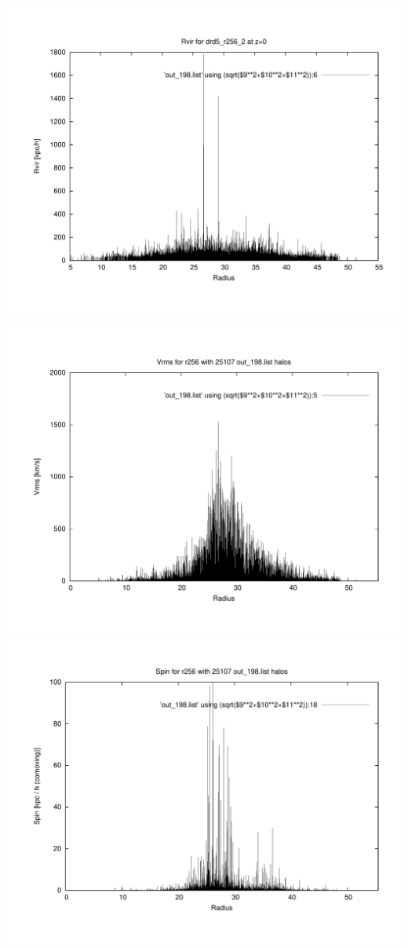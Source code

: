 \includegraphics[scale=0.3]{r256/drd5_r256_2/plot_rvir_z0.pdf}

\includegraphics[scale=0.3]{r256/drd5_r256_2/plot_Vrms_out_198.pdf}
\includegraphics[scale=0.3]{r256/drd5_r256_2/plot_spin_out_198.pdf}

